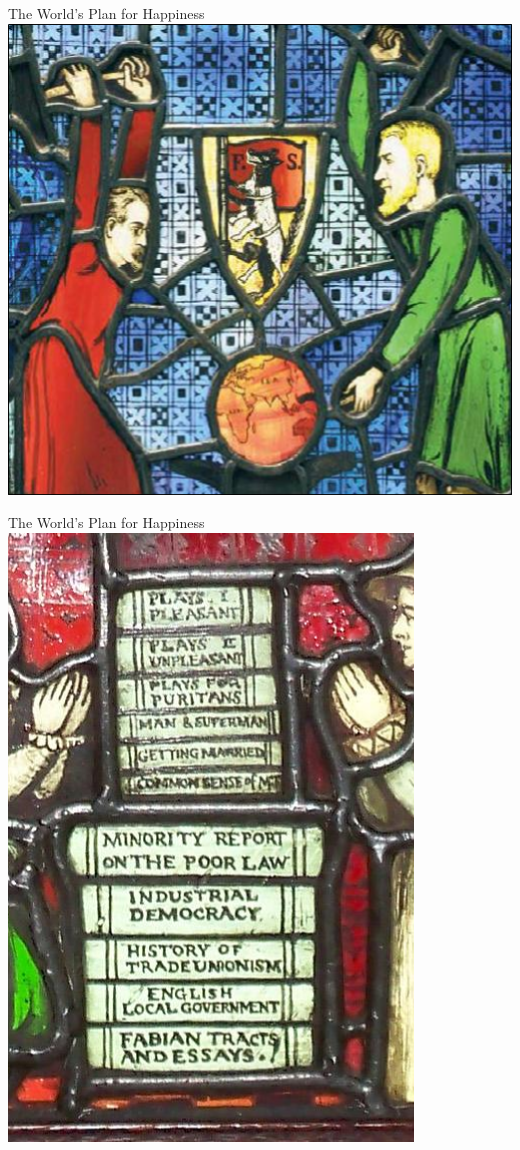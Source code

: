 \begin{frame}{The World's Plan for Happiness}
    \centering
    \includegraphics[width=.9\textwidth]{img/remold-hammers.png} \\
\end{frame}

\begin{frame}{The World's Plan for Happiness}
    \centering
    \includegraphics[height=.9\textheight]{img/fabian-books.png} \\
\end{frame}


